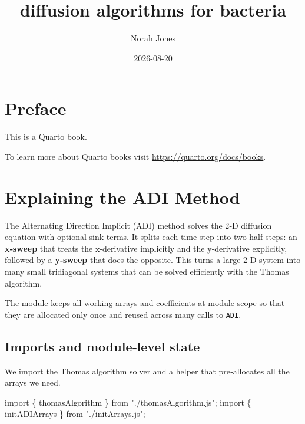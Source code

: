 \documentclass[
  letterpaper,
  DIV=11,
  numbers=noendperiod]{scrreprt}
\title{diffusion algorithms for bacteria}
\author{Norah Jones}
\date{2026-08-20}
\newenvironment{Shaded}{\begin{snugshade}}{\end{snugshade}}
\newcommand{\ImportTok}[1]{\textcolor[rgb]{0.00,0.46,0.62}{#1}}
\newcommand{\NormalTok}[1]{\textcolor[rgb]{0.00,0.23,0.31}{#1}}
\newcommand{\OperatorTok}[1]{\textcolor[rgb]{0.37,0.37,0.37}{#1}}
\newcommand{\StringTok}[1]{\textcolor[rgb]{0.13,0.47,0.30}{#1}}
\renewcommand*\contentsname{Table of contents}
\newcommand\contentsname{Table of contents}
\begin{document}
\maketitle

\renewcommand*\contentsname{Table of contents}
{
\hypersetup{linkcolor=}
\setcounter{tocdepth}{2}
\tableofcontents
}


\chapter*{Preface}\label{preface}


This is a Quarto book.

To learn more about Quarto books visit
\url{https://quarto.org/docs/books}.


\chapter{Explaining the ADI Method}\label{explaining-the-adi-method}

The Alternating Direction Implicit (ADI) method solves the 2‑D diffusion
equation with optional sink terms. It splits each time step into two
half‑steps: an \textbf{x‑sweep} that treats the x‑derivative implicitly
and the y‑derivative explicitly, followed by a \textbf{y‑sweep} that
does the opposite. This turns a large 2‑D system into many small
tridiagonal systems that can be solved efficiently with the Thomas
algorithm.

The module keeps all working arrays and coefficients at module scope so
that they are allocated only once and reused across many calls to
\texttt{ADI}.

\section{Imports and module‑level
state}\label{imports-and-modulelevel-state}

We import the Thomas algorithm solver and a helper that pre‑allocates
all the arrays we need.

\label{adi-imports}%
\begin{Shaded}
\begin{Highlighting}[]
\ImportTok{import}\NormalTok{ \{ thomasAlgorithm \} }\ImportTok{from} \StringTok{"./thomasAlgorithm.js"}\OperatorTok{;}
\ImportTok{import}\NormalTok{ \{ initADIArrays \} }\ImportTok{from} \StringTok{"./initArrays.js"}\OperatorTok{;}
\end{Highlighting}
\end{Shaded}
\end{document}
